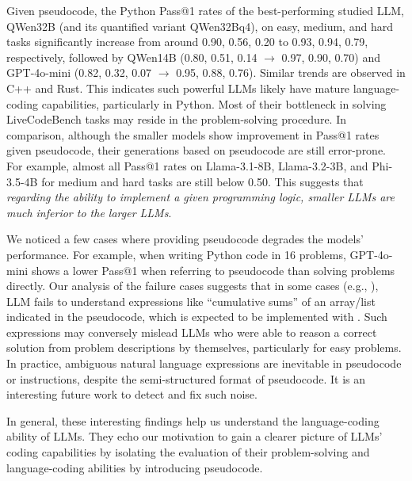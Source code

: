 Given pseudocode, the Python Pass@1 rates of the best-performing studied LLM, QWen32B (and its quantified variant QWen32Bq4), on easy, medium, and hard tasks significantly increase from around 0.90, 0.56, 0.20 to 0.93, 0.94, 0.79, respectively, followed by QWen14B (0.80, 0.51, 0.14 $\rightarrow$ 0.97, 0.90, 0.70) and GPT-4o-mini (0.82, 0.32, 0.07 $\rightarrow$ 0.95, 0.88, 0.76). Similar trends are observed in C++ and Rust.
This indicates such powerful LLMs likely have mature language-coding capabilities, particularly in Python.
Most of their bottleneck in solving LiveCodeBench tasks may reside in the problem-solving procedure. 
In comparison, although the smaller models show improvement in Pass@1 rates given pseudocode, their generations based on pseudocode are still error-prone.
For example, almost all Pass@1 rates on Llama-3.1-8B, Llama-3.2-3B, and Phi-3.5-4B for medium and hard tasks are still below 0.50. 
This suggests that \textit{regarding the ability to implement a given programming logic, smaller LLMs are much inferior to the larger LLMs}. 








We noticed a few cases where providing pseudocode degrades the models' performance. 
For example, when writing Python code in 16 problems, %
GPT-4o-mini shows a lower Pass@1 when referring to pseudocode than solving problems directly.
Our analysis of the failure cases suggests that in some cases (e.g., ), LLM fails to understand expressions like ``cumulative sums'' of an array/list indicated in the pseudocode, which is expected to be implemented with . Such expressions may conversely mislead LLMs who were able to reason a correct solution from problem descriptions by themselves, particularly for easy problems.
In practice, ambiguous natural language expressions are inevitable in pseudocode or instructions, despite the semi-structured format of pseudocode. It is an interesting future work to detect and fix such noise.

In general, these interesting findings help us understand the language-coding ability of LLMs. They echo our motivation to gain a clearer picture of LLMs' coding capabilities by isolating the evaluation of their problem-solving and language-coding abilities by introducing pseudocode.






